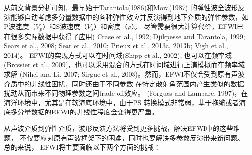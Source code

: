 从前文背景分析可知，最早始于Tarantola(1986)\cite{tarantola:1986}和Mora(1987)\cite{mora:1987}
的弹性波全波形反演能够自动考虑多分量数据中的各种弹性效应并反演得到地下介质的弹性参数，如P波速度（$V_p$）和S波速度（$V_s$）和密度（$\rho$）。
尽管需要很大计算代价，EFWI已在很多实际数据中获得了应用(
Crase et al., 1992\cite{crase1992nonlinear}; Djikpesse and Tarantola,
1999\cite{djikpesse.tarantola:1999}; Sears et al., 2008\cite{sears2008}; Sear et al.,
2010\cite{sears:2010}; Prieux et al., 2013a\cite{prieux:2013a}, 2013b\cite{prieux:2013b}; Vigh et al.,
2014\cite{vigh:2014})。
EFWI的实现方式可以在时间域(Shipp et al., 2002\cite{shipp:2002}),
也可以在频率域(Brossier et al., 2009\cite{brossier2009})，也可以采用混合的方式在时间域进行正演模拟而在频率域求解
(Nihei and Li, 2007\cite{nihei.li:2007}; Sirgue et al.,
2008\cite{sirgue:2008})。然而，EFWI不仅会受到原有声波介质中的非线性困扰，同时还由于不同参数
在特定散射角范围内产生类似的数据扰动从而带来不同物理参数之间trade-off效应。
(Forgues and Lambare, 1997\cite{forgues.lambare:1997})。在海洋环境中，尤其是在软海底环境中，由于PS
转换模式非常弱，基于拖缆或者海底多分量数据的EFWI的非线性程度会变得更严重\cite{sears2008}。

从声波介质到弹性介质，波形反演方法将受到更多挑战，解决EFWI中的这些难题，
不仅要应对原有声波框架下的困难，同时也要解决多参数反演带来新问题。总的来说，
EFWI将主要面临以下两个方面的挑战：

